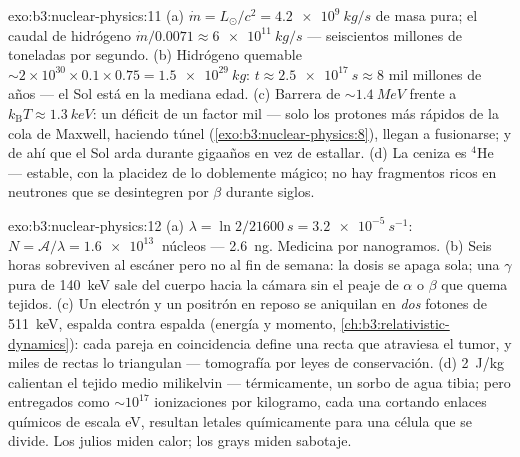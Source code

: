 \begin{solution}{exo:b3:nuclear-physics:11}
(a) $\dot m = L_\odot/c^2 = \qty{4.2e9}{kg/s}$ de masa pura;
el caudal de hidrógeno $\dot m/0.0071 \approx \qty{6e11}{kg/s}$ ---
seiscientos millones de toneladas por segundo. (b) Hidrógeno quemable
${\sim}2\times10^{30}\times0.1\times0.75 = \qty{1.5e29}{kg}$:
$t \approx \qty{2.5e17}{s} \approx 8$ mil millones de años --- el Sol
está en la mediana edad. (c) Barrera de ${\sim}\qty{1.4}{MeV}$ frente a
$k_{\text{B}}T \approx \qty{1.3}{keV}$: un déficit de un factor mil
--- solo los protones más rápidos de la cola de Maxwell, haciendo túnel
(\cref{exo:b3:nuclear-physics:8}), llegan a fusionarse; y de ahí que el Sol
arda durante gigaaños en vez de estallar. (d) La ceniza es
$^4$He --- estable, con la placidez de lo doblemente mágico; no hay
fragmentos ricos en neutrones que se desintegren por $\beta$ durante siglos.
\end{solution}

\begin{solution}{exo:b3:nuclear-physics:12}
(a) $\lambda = \ln2/\qty{21600}{s} = \qty{3.2e-5}{s^{-1}}$:
$N = \mathcal A/\lambda = \qty{1.6e13}{}$ núcleos ---
\qty{2.6}{ng}. Medicina por nanogramos. (b) Seis horas sobreviven
al escáner pero no al fin de semana: la dosis se apaga sola; una
$\gamma$ pura de \qty{140}{keV} sale del cuerpo hacia la cámara
sin el peaje de $\alpha$ o $\beta$ que quema tejidos. (c) Un electrón
y un positrón en reposo se aniquilan en \emph{dos}
fotones de \qty{511}{keV}, espalda contra espalda (energía y momento,
\cref{ch:b3:relativistic-dynamics}): cada pareja en coincidencia
define una recta que atraviesa el tumor, y miles de rectas
lo triangulan --- tomografía por leyes de conservación. (d)
\qty{2}{J/kg} calientan el tejido medio milikelvin --- térmicamente, un
sorbo de agua tibia; pero entregados como ${\sim}10^{17}$ ionizaciones
por kilogramo, cada una cortando enlaces químicos de escala \unit{eV}, resultan
letales químicamente para una célula que se divide. Los julios miden calor;
los grays miden sabotaje.
\end{solution}

